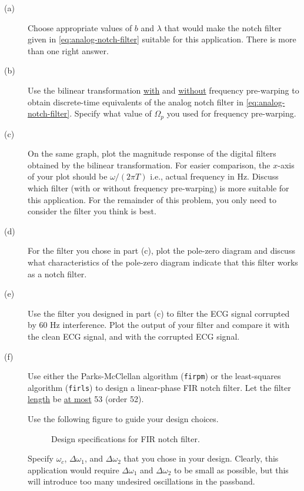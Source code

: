 \documentclass[12pt]{report}
\begin{document}
\begin{description}
	\item[(a)] Choose appropriate values of $b$ and $\lambda$ that would make the notch filter given in \eqref{eq:analog-notch-filter} suitable for this application. There is more than one right answer. 
	
	\item[(b)] Use the bilinear transformation \underline{with} and \underline{without} frequency pre-warping to obtain discrete-time equivalents of the analog notch filter in \eqref{eq:analog-notch-filter}. Specify what value of $\Omega_p$ you used for frequency pre-warping. 
	
	\item[(c)] On the same graph, plot the magnitude response of the digital filters obtained by the bilinear transformation. For easier comparison, the $x$-axis of your plot should be $\omega/(2\pi T)$ i.e., actual frequency in Hz. Discuss which filter (with or without frequency pre-warping) is more suitable for this application. For the remainder of this problem, you only need to consider the filter you think is best. 
	
	\item[(d)] For the filter you chose in part (c), plot the pole-zero diagram and discuss what characteristics of the pole-zero diagram indicate that this filter works as a notch filter. 
	 
	\item[(e)] Use the filter you designed in part (c) to filter the ECG signal corrupted by 60 Hz interference. Plot the output of your filter and compare it with the clean ECG signal, and with the corrupted ECG signal.
	
	\item[(f)] Use either the Parks-McClellan algorithm (\texttt{firpm}) or the least-squares algorithm (\texttt{firls}) to design a linear-phase FIR notch filter. Let the filter \underline{length} be \underline{at most} 53 (order 52).
	
	Use the following figure to guide your design choices. 
		
	\FloatBarrier
	\begin{figure}[h!]
		\centering
		\resizebox{0.6\textwidth}{!}{}
		\caption{Design specifications for FIR notch filter.}
	\end{figure}
	\FloatBarrier
	
	Specify $\omega_c$, $\Delta\omega_1$, and $\Delta\omega_2$ that you chose in your design. Clearly, this application would require $\Delta\omega_1$ and $\Delta\omega_2$ to be small as possible, but this will introduce too many undesired oscillations in the passband. 
	

\end{description}
\end{document}
